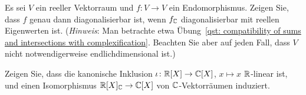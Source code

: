 \begin{question}
  Es sei $V$ ein reeller Vektorraum und $f \colon V \to V$ ein Endomorphismus.
  Zeigen Sie, dass $f$ genau dann diagonalisierbar ist, wenn $f_{\mathbb{C}}$ diagonalisierbar mit reellen Eigenwerten ist.
  \newline
  (\emph{Hinweis}:
   Man betrachte etwa Übung~\ref{qst: compatibility of sums and intersections with complexification}.
   Beachten Sie aber auf jeden Fall, dass $V$ nicht notwendigerweise endlichdimensional ist.)
\end{question}


\begin{question}
  Zeigen Sie, dass die kanonische Inklusion $\iota \colon \mathbb{R}[X] \to \mathbb{C}[X]$, $x \mapsto x$ $\mathbb{R}$-linear ist, und einen Isomorphismus $\mathbb{R}[X]_{\mathbb{C}} \to \mathbb{C}[X]$ von $\mathbb{C}$-Vektorräumen induziert.
\end{question}


